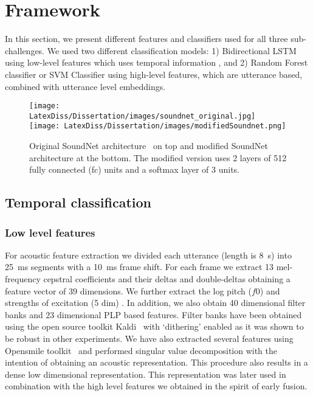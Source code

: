 \section{Framework}

In this section, we present different features and classifiers used for all three sub-challenges. We used two different classification models: 1) Bidirectional LSTM using low-level features which uses temporal information , and 2) Random Forest classifier or SVM Classifier using high-level features, which are utterance based, combined with utterance level embeddings. 



\begin{figure}[t]
  \centering
  \texttt{[image: LatexDiss/Dissertation/images/soundnet\_original.jpg]}
  \texttt{[image: LatexDiss/Dissertation/images/modifiedSoundnet.png]}
  \caption{Original SoundNet architecture~\cite{aytar2016soundnet} on top and modified SoundNet architecture at the bottom. The modified version uses 2 layers of 512 fully connected (fc) units and a softmax layer of 3 units.}
  \label{embedding_extraction}
\end{figure}

\subsection{Temporal classification}


\subsubsection{Low level features}

For acoustic feature extraction we divided each utterance (length is \SI{8}{\second}) into \SI{25}{\milli\second} segments with a \SI{10}{\milli\second} frame shift. For each frame we extract 13 mel-frequency cepstral coefficients and their deltas and double-deltas obtaining a feature vector of 39 dimensions. We further extract the log pitch ($f0$) and strengths of excitation (5 dim) \cite{yoshimura2001mixed}. In addition, we also obtain 40 dimensional filter banks and 23 dimensional PLP based features. Filter banks have been obtained using the open source toolkit Kaldi~\cite{kaldi2011} with `dithering' enabled as it was shown to be robust in other experiments. We have also extracted several features using Opensmile toolkit~\cite{opensmile2010} and performed singular value decomposition with the intention of obtaining an acoustic representation. This procedure also results in a dense low dimensional representation.  This representation was later used  in combination with the high level features we obtained in the spirit of early fusion. 

